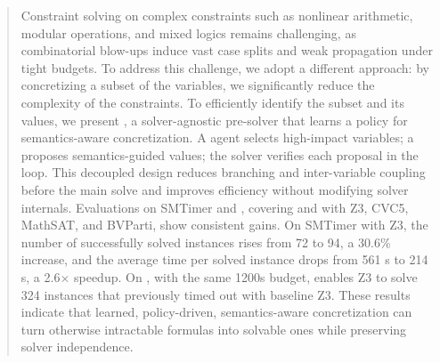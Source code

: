 \begin{abstract}
Constraint solving on complex \SMT{} constraints such as nonlinear arithmetic, modular operations, and mixed logics remains challenging, as combinatorial blow-ups induce vast case splits and weak propagation under tight budgets. To address this challenge, we adopt a different approach: by concretizing a subset of the variables, we significantly reduce the complexity of the constraints. To efficiently identify the subset and its values, we present \tool, a solver-agnostic pre-solver that learns a policy for semantics-aware concretization. A \RL{} agent selects high-impact variables; a \LLM{} proposes semantics-guided values; the solver verifies each proposal in the loop. This decoupled design reduces branching and inter-variable coupling before the main solve and improves efficiency without modifying solver internals. 
Evaluations on SMTimer and \SMTCOMP{}, covering \QFLIA{} and \QFNIA{} with Z3, CVC5, MathSAT, and BVParti, show consistent gains. On SMTimer with Z3, the number of successfully solved instances rises from 72 to 94, a 30.6\% increase, and the average time per solved instance drops from 561 s to 214 s, a 2.6$\times$ speedup. On \QFNIA{}, with the same 1200s budget, \tool enables Z3 to solve 324 instances that previously timed out with baseline Z3. These results indicate that learned, policy-driven, semantics-aware concretization can turn otherwise intractable formulas into solvable ones while preserving solver independence.


\end{abstract}